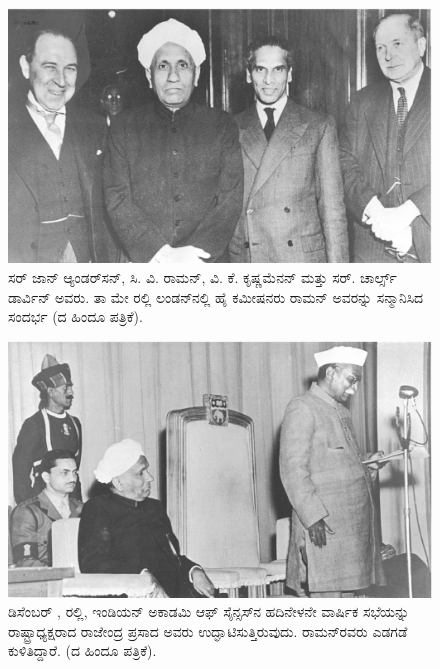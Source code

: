 \begin{figure}[!htbp]
\centering
\includegraphics[scale=0.22]{"images/5.jpg"}
\caption{ಸರ್ ಜಾನ್ ಆ್ಯಂಡರ್‌ಸನ್, ಸಿ. ವಿ. ರಾಮನ್, ವಿ. ಕೆ. ಕೃಷ್ಣಮೆನನ್ ಮತ್ತು ಸರ್. ಚಾರ್ಲ್ಸ್ ಡಾರ್ವಿನ್ ಅವರು. ತಾ  ಮೇ ರಲ್ಲಿ ಲಂಡನ್‍ನಲ್ಲಿ ಹೈ ಕಮೀಷನರು ರಾಮನ್ ಅವರನ್ನು ಸನ್ಮಾನಿಸಿದ ಸಂದರ್ಭ (ದ ಹಿಂದೂ ಪತ್ರಿಕೆ).}\label{chap3-fig03}
\end{figure}


\begin{figure}[!htbp]
\centering
\includegraphics[scale=0.22]{"images/6.jpg"}
\caption{ಡಿಸೆಂಬರ್ , ರಲ್ಲಿ, ಇಂಡಿಯನ್ ಅಕಾಡಮಿ ಆಫ್ ಸೈನ್ಸಸ್‍ನ ಹದಿನೇಳನೇ ವಾರ್ಷಿಕ ಸಭೆಯನ್ನು ರಾಷ್ಟ್ರಾಧ್ಯಕ್ಷರಾದ ರಾಜೇಂದ್ರ ಪ್ರಸಾದ ಅವರು ಉದ್ಘಾಟಿಸುತ್ತಿರುವುದು. ರಾಮನ್‍ರವರು ಎಡಗಡೆ ಕುಳಿತಿದ್ದಾರೆ. (ದ ಹಿಂದೂ ಪತ್ರಿಕೆ).}\label{chap3-fig04}
\end{figure}

\clearpage

